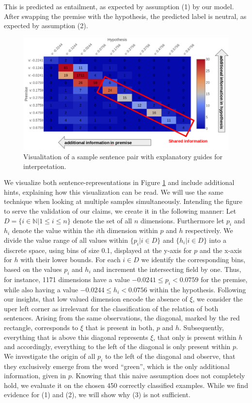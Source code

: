 This is predicted as entailment, as expected by assumption (1) by our model. After swapping the premise with the hypothesis, the predicted label is neutral, as expected by assumption (2).
\begin{figure}[tph!]
\centering
	\includegraphics[totalheight=6cm]{fig/sample_coverage_prob.png}
	\caption{Visualitation of a sample sentence pair with explanatory guides for interpretation.}
	\label{fig:sample_coverage_prob}
\end{figure}
We visualize both sentence-representations in Figure \ref{fig:sample_coverage_prob} and include additional hints, explaining how this visualization can be read. We will use the same technique when looking at multiple samples simultaneously. Intending the figure to serve the validation of our claims, we create it in the following manner: Let $D = \{i \in \mathbb{N} | 1 \leq i \leq n\}$ denote the set of all $n$ dimensions. Furthermore let $p_i$ and $h_i$ denote the value within the $i$th dimension within $p$ and $h$ respectively. We divide the value range of all values within $\{p_i | i \in D\}$ and $\{h_i | i \in D\}$ into a discrete space, using bins of size 0.1, displayed at the y-axis for $p$ and the x-axis for $h$ with their lower bounds. For each $i \in D$ we identify the corresponding bins, based on the values $p_i$ and $h_i$ and increment the intersecting field by one. Thus, for instance, 1171 dimensions have a value $-0.0241 \leq p_i < 0.0759$ for the premise, while also having a value $-0.0244 \leq h_i < 0.0756$ within the hypothesis. Following our insights, that low valued dimension encode the absence of $\xi$, we consider the uper left corner as irrelevant for the classification of the relation of both sentences. Arising from the same observations, the diagonal, marked by the red rectangle, corresponds to $\xi$ that is present in both, $p$ and $h$. Subsequently, everything that is above this diagonal represents $\xi$, that only is present within $h$ and accordingly, everything to the left of the diagonal is only present within $p$. We investigate the origin of all $p_i$ to the left of the diagonal and observe, that they exclusively emerge from the word ``green'', which is the only additional information, given in $p$.
Knowing that this naive assumption does not completely hold, we evaluate it on the chosen 450 correctly classified examples. While we find evidence for (1) and (2), we will show why (3) is not sufficient. 

